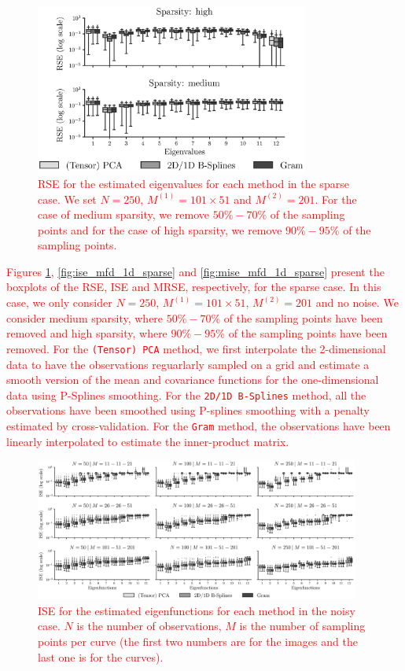 \begin{figure}
    \centering
    \includegraphics[width=0.8\textwidth]{figures/AE_sparse.eps}
    \caption{\textcolor{red}{RSE for the estimated eigenvalues for each method in the sparse case. We set $N = 250$, $M^{(1)} = 101 \times 51$ and $M^{(2)} = 201$. For the case of medium sparsity, we remove $50\%-70\%$ of the sampling points and for the case of high sparsity, we remove $90\%-95\%$ of the sampling points.}}
    \label{fig:logAE_mfd_1d_sparse}
\end{figure}


\textcolor{red}{Figures \ref{fig:logAE_mfd_1d_sparse}, \ref{fig:ise_mfd_1d_sparse} and \ref{fig:mise_mfd_1d_sparse} present the boxplots of the RSE, ISE and MRSE, respectively, for the sparse case. In this case, we only consider $N = 250$, $M^{(1)} = 101 \times 51$, $M^{(2)} = 201$ and no noise. We consider medium sparsity, where $50\%-70\%$ of the sampling points have been removed and high sparsity, where $90\%-95\%$ of the sampling points have been removed. For the \texttt{(Tensor) PCA} method, we first interpolate the 2-dimensional data to have the observations reguarlarly sampled on a grid and estimate a smooth version of the mean and covariance functions for the one-dimensional data using P-Splines smoothing. For the \texttt{2D/1D B-Splines} method, all the observations have been smoothed using P-splines smoothing with a penalty estimated by cross-validation. For the \texttt{Gram} method, the observations have been linearly interpolated to estimate the inner-product matrix.}



\begin{figure}
     \centering
    \includegraphics[width=0.95\textwidth]{figures/ISE_noise.eps}
    \caption{\textcolor{red}{ISE for the estimated eigenfunctions for each method in the noisy case. $N$ is the number of observations, $M$ is the number of sampling points per curve (the first two numbers are for the images and the last one is for the curves).}}
    \label{fig:ise_mfd_1d_noise}
\end{figure}

